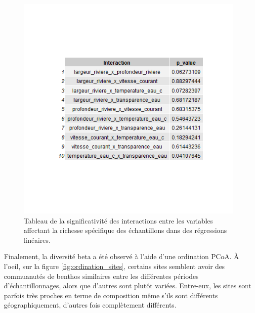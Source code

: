 \documentclass[9pt,twocolumn,twoside,]{pnas-new}
\begin{document}
\begin{figure}
\centering
\includegraphics{tableau_interaction.png}
\caption{Tableau de la significativité des interactions entre les
variables affectant la richesse spécifique des échantillons dans des
régressions linéaires. \label{fig:tableau_interaction}}
\end{figure}

Finalement, la diversité beta a été observé à l'aide d'une ordination
PCoA. À l'oeil, sur la figure \ref{fig:ordination_sites}, certains sites
semblent avoir des commuanutés de benthos similaires entre les
différentes périodes d'échantillonnages, alors que d'autres sont plutôt
variées. Entre-eux, les sites sont parfois très proches en terme de
composition même s'ils sont différents géographiquement, d'autres fois
complètement différents.
\end{document}
